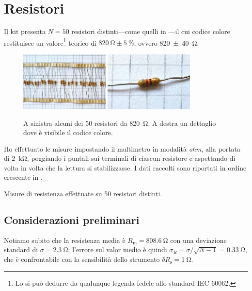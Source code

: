     \section{Resistori}\label{s:mul:resistori}
        Il kit presenta $N = \num{50}$ resistori distinti---come quelli in ---il cui codice colore restituisce un valore\footnote{Lo si può dedurre da qualunque legenda fedele allo standard IEC 60062.} teorico di $\SI{820}{\ohm} \pm \SI{5}{\%}$, ovvero \SI{820(40)}{\ohm}.
        \begin{figure}
            \centering
            \includegraphics[width=0.4\textwidth]{images/multimetro/resistori.jpg}
            \hspace{0.05\textwidth}
            \includegraphics[width=0.4\textwidth]{images/multimetro/resistore.jpg}
            \caption{A sinistra alcuni dei \num{50} resistori da \SI{820}{\ohm}. A destra un dettaglio dove è visibile il codice colore.}
            \label{fig:mul:resistore}
        \end{figure}

        Ho effettuato le misure impostando il multimetro in modalità \emph{ohm}, alla portata di \SI{2}{\kilo\ohm}, poggiando i puntali sui terminali di ciascun resistore e aspettando di volta in volta che la lettura si stabilizzasse. I dati raccolti sono riportati in ordine crescente in .
        \begin{table}
            \centering
            
            \caption{Misure di resistenza effettuate su \num{50} resistori distinti.}
            \label{tab:mul:resistori}
        \end{table}

        \subsection{Considerazioni preliminari}
            Notiamo subito che la resistenza media è $R_\text{m} = \SI{808.6}{\ohm}$ con una deviazione standard di $\sigma = \SI{2.3}{\ohm}$; l'errore sul valor medio è quindi $\sigma_R = \sigma / \sqrt{N-1} = \SI{0.33}{\ohm}$, che è confrontabile con la sensibilità dello strumento $\delta R_\text{s} = \SI{1}{\ohm}$.
            

